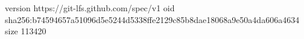version https://git-lfs.github.com/spec/v1
oid sha256:b74594657a51096d5e5244d5338ffe2129c85b8dae18068a9e50a4da606a4634
size 113420
